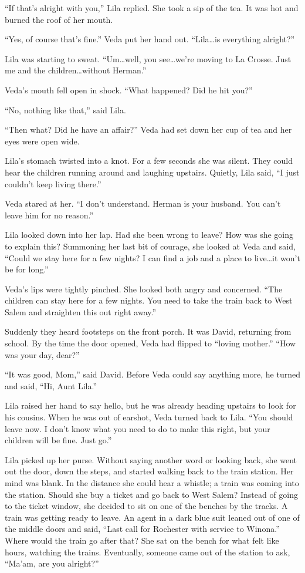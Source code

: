 \documentclass[
  american,
  letterpaper,
]{book}
\begin{document}
``If that's alright with you,'' Lila replied. She took a sip of the tea.
It was hot and burned the roof of her mouth.

``Yes, of course that's fine.'' Veda put her hand out. ``Lila\ldots is
everything alright?''

Lila was starting to sweat. ``Um\ldots well, you see\ldots we're moving
to La Crosse. Just me and the children\ldots without Herman.''

Veda's mouth fell open in shock. ``What happened? Did he hit you?''

``No, nothing like that,'' said Lila.

``Then what? Did he have an affair?'' Veda had set down her cup of tea
and her eyes were open wide.

Lila's stomach twisted into a knot. For a few seconds she was silent.
They could hear the children running around and laughing upstairs.
Quietly, Lila said, ``I just couldn't keep living there.''

Veda stared at her. ``I don't understand. Herman is your husband. You
can't leave him for no reason.''

Lila looked down into her lap. Had she been wrong to leave? How was she
going to explain this? Summoning her last bit of courage, she looked at
Veda and said, ``Could we stay here for a few nights? I can find a job
and a place to live\ldots it won't be for long.''

Veda's lips were tightly pinched. She looked both angry and concerned.
``The children can stay here for a few nights. You need to take the
train back to West Salem and straighten this out right away.''

Suddenly they heard footsteps on the front porch. It was David,
returning from school. By the time the door opened, Veda had flipped to
``loving mother.'' ``How was your day, dear?''

``It was good, Mom,'' said David. Before Veda could say anything more,
he turned and said, ``Hi, Aunt Lila.''

Lila raised her hand to say hello, but he was already heading upstairs
to look for his cousins. When he was out of earshot, Veda turned back to
Lila. ``You should leave now. I don't know what you need to do to make
this right, but your children will be fine. Just go.''

Lila picked up her purse. Without saying another word or looking back,
she went out the door, down the steps, and started walking back to the
train station. Her mind was blank. In the distance she could hear a
whistle; a train was coming into the station. Should she buy a ticket
and go back to West Salem? Instead of going to the ticket window, she
decided to sit on one of the benches by the tracks. A train was getting
ready to leave. An agent in a dark blue suit leaned out of one of the
middle doors and said, ``Last call for Rochester with service to
Winona.'' Where would the train go after that? She sat on the bench for
what felt like hours, watching the trains. Eventually, someone came out
of the station to ask, ``Ma'am, are you alright?''
\end{document}
